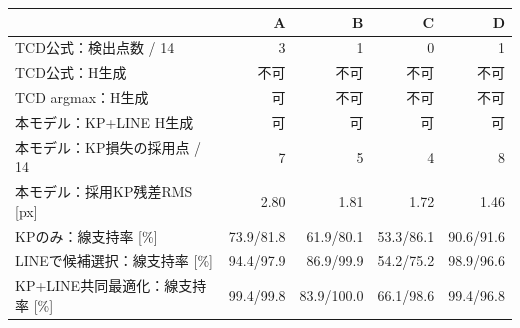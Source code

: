 \begin{tabular}{@{}lrrrr@{}}\toprule
 & A & B & C & D\\\midrule
TCD公式：検出点数 / 14 & 3 & 1 & 0 & 1\\
TCD公式：H生成 & 不可 & 不可 & 不可 & 不可\\
TCD argmax：H生成 & 可 & 不可 & 不可 & 不可\\
本モデル：KP+LINE H生成 & 可 & 可 & 可 & 可\\
本モデル：KP損失の採用点 / 14 & 7 & 5 & 4 & 8\\
本モデル：採用KP残差RMS [px] & 2.80 & 1.81 & 1.72 & 1.46\\
KPのみ：線支持率 [\%] & 73.9/81.8 & 61.9/80.1 & 53.3/86.1 & 90.6/91.6\\
LINEで候補選択：線支持率 [\%] & 94.4/97.9 & 86.9/99.9 & 54.2/75.2 & 98.9/96.6\\
KP+LINE共同最適化：線支持率 [\%] & 99.4/99.8 & 83.9/100.0 & 66.1/98.6 & 99.4/96.8\\
\bottomrule\end{tabular}
